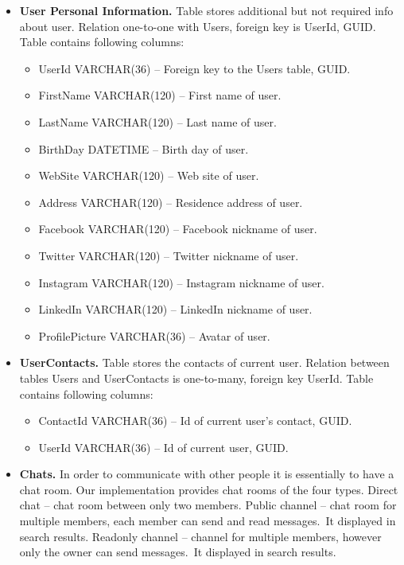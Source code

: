 \begin{itemize}
    \item \textbf{User Personal Information.} Table stores additional but not required info about user.
    Relation one-to-one with Users, foreign key is UserId, GUID\@.
    Table contains following columns:
    \begin{itemize}
        \item UserId VARCHAR(36) -- Foreign key to the Users table, GUID\@.
        \item FirstName VARCHAR(120) -- First name of user.
        \item LastName VARCHAR(120) -- Last name of user.
        \item BirthDay DATETIME -- Birth day of user.
        \item WebSite VARCHAR(120) -- Web site of user.
        \item Address VARCHAR(120) -- Residence address of user.
        \item Facebook VARCHAR(120) -- Facebook nickname of user.
        \item Twitter VARCHAR(120) -- Twitter nickname of user.
        \item Instagram VARCHAR(120) -- Instagram nickname of user.
        \item LinkedIn VARCHAR(120) -- LinkedIn nickname of user.
        \item ProfilePicture VARCHAR(36) -- Avatar of user.
    \end{itemize}
    \item \textbf{UserContacts.} Table stores the contacts of current user.
    Relation between tables Users and UserContacts is one-to-many, foreign key UserId.
    Table contains following columns:
    \begin{itemize}
        \item ContactId VARCHAR(36) -- Id of current user's contact, GUID\@.
        \item UserId VARCHAR(36) -- Id of current user, GUID\@.
    \end{itemize}
    \item \textbf{Chats.} In order to communicate with other people it is essentially to have a chat room.
    Our implementation provides chat rooms of the four types.
    Direct chat -- chat room between only two members.
    Public channel -- chat room for multiple members, each member can send and read messages.\ It displayed in search results.
    Readonly channel -- channel for multiple members, however only the owner can send messages.\ It displayed in search results.

\end{itemize}
